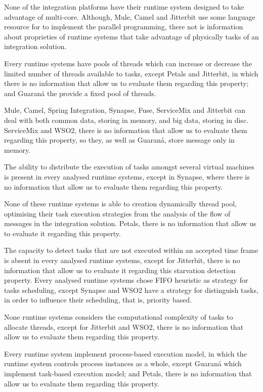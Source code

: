 None of the integration platforms have their runtime system designed to take advantage of multi-core. Although, Mule, Camel and Jitterbit use some language resource for to implement the parallel programming, there not is information about proprieties of runtime systems that take advantage of physically tasks of an integration solution.

Every runtime systems have pools of threads which can increase or decrease the limited number of threads available to tasks, except Petals and Jitterbit, in which there is no information that allow us to evaluate them regarding this property; and Guaraná the provide a fixed pool of threads.

Mule, Camel, Spring Integration, Synapse, Fuse, ServiceMix and Jitterbit can deal with both common data, storing in memory, and big data, storing in disc. ServiceMix and WSO2, there is no information that allow us to evaluate them regarding this property, so they, as well as Guaraná, store message only in memory.

The ability to distribute the execution of tasks amongst several virtual machines is present in every analysed runtime systems, except in Synapse, where there is no information that allow us to evaluate them regarding this property. 

None of these runtime systems is able to creation dynamically thread pool, optimising their task execution strategies from the analysis of the flow of messages in the integration solution. Petals, there is no information that allow us to evaluate it regarding this property.

The capacity to detect tasks that are not executed within an accepted time frame is absent in every analysed runtime systems, except for Jitterbit, there is no information that allow us to evaluate it regarding this starvation detection property. Every analysed runtime systems chose FIFO heuristic as strategy for tasks scheduling, except Synapse and WSO2 have a strategy for distinguish tasks, in order to influence their scheduling, that is, priority based. 

None runtime systems considers the computational complexity of tasks to allocate threads, except for Jitterbit and WSO2, there is no information that allow us to evaluate them regarding this property.

Every runtime system implement process-based execution model, in which the runtime system controls process instances as a whole, except Guaraná which implement task-based execution model; and Petals, there is no information that allow us to evaluate them regarding this property. 

